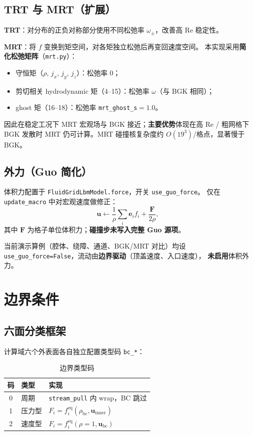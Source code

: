 \documentclass[UTF8,a4paper,11pt]{ctexart}
\newcommand{\vecu}{\mathbf{u}}
\newcommand{\vece}{\mathbf{e}}
\newcommand{\feq}{f^{\mathrm{eq}}}
\begin{document}
\subsection{TRT 与 MRT（扩展）}

\textbf{TRT}：对分布的正负对称部分使用不同松弛率 $\omega_\pm$，改善高 Re 稳定性。

\textbf{MRT}：将 $f$ 变换到矩空间，对各矩独立松弛后再变回速度空间。
本实现采用\textbf{简化松弛矩阵}（\texttt{mrt.py}）：
\begin{itemize}
  \item 守恒矩（$\rho$, $j_x$, $j_y$, $j_z$）：松弛率 $0$；
  \item 剪切相关 hydrodynamic 矩（4--15）：松弛率 $\omega$（与 BGK 相同）；
  \item ghost 矩（16--18）：松弛率 \texttt{mrt\_ghost\_s}$=1.0$。
\end{itemize}
因此在稳定工况下 MRT 宏观场与 BGK 接近；\textbf{主要优势}体现在高 Re / 粗网格下
BGK 发散时 MRT 仍可计算。MRT 碰撞核复杂度约 $O(19^3)$/格点，显著慢于 BGK。

\subsection{外力（Guo 简化）}

体积力配置于 \texttt{FluidGridLbmModel.force}，开关 \texttt{use\_guo\_force}。
仅在 \texttt{update\_macro} 中对宏观速度做修正：
\begin{equation}
  \vecu \leftarrow \frac{1}{\rho}\sum_i \vece_i f_i + \frac{\mathbf{F}}{2\rho},
\end{equation}
其中 $\mathbf{F}$ 为格子单位体积力；\textbf{碰撞步未写入完整 Guo 源项}。

当前演示算例（腔体、绕障、通道、BGK/MRT 对比）均设
\texttt{use\_guo\_force=False}，流动由\textbf{边界驱动}（顶盖速度、入口速度），
\textbf{未启用}体积外力。

\section{边界条件}

\subsection{六面分类框架}

计算域六个外表面各自独立配置类型码 \texttt{bc\_*}：
\begin{table}[H]
  \centering
  \caption{边界类型码}
  \begin{tabular}{@{}cll@{}}
    \toprule
    码 & 类型 & 实现 \\
    \midrule
    0 & 周期 & \texttt{stream\_pull} 内 wrap，BC 跳过 \\
    1 & 压力型 & $F_i = \feq_i(\rho_{\mathrm{bc}}, \vecu_{\mathrm{inner}})$ \\
    2 & 速度型 & $F_i = \feq_i(\rho=1, \vecu_{\mathrm{bc}})$ \\
    \bottomrule
  \end{tabular}
\end{table}
\end{document}
